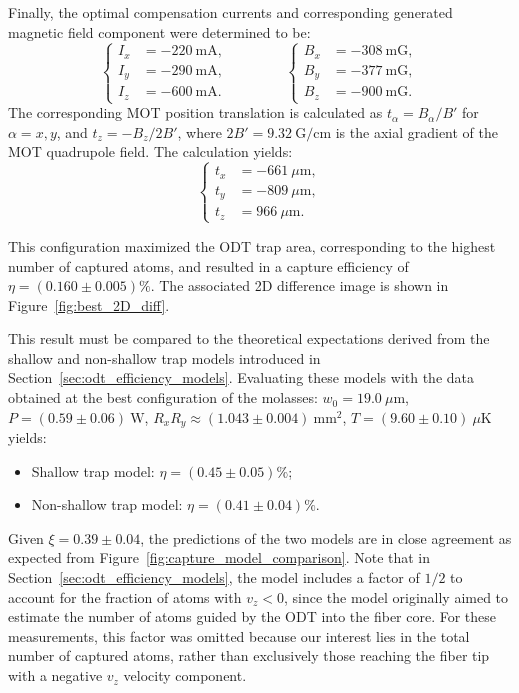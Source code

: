 Finally, the optimal compensation currents and corresponding generated magnetic field component were determined to be:
\begin{equation}
    \begin{cases}
        I_{x} &= -220~\mathrm{mA}, \\
        I_{y} &= -290~\mathrm{mA}, \\
        I_{z} &= -600~\mathrm{mA}.
    \end{cases}
    \qquad \qquad
        \begin{cases}
        B_{x} &= -308~\mathrm{mG}, \\
        B_{y} &= -377~\mathrm{mG}, \\
        B_{z} &= -900~\mathrm{mG}.
    \end{cases}
\end{equation}
The corresponding MOT position translation is calculated as $t_\alpha=B_\alpha/B'$ for $\alpha=x,y$, and $t_z=-B_z/2B'$, where $2B'=9.32~\text{G/cm}$ is the axial gradient of the MOT quadrupole field. The calculation yields:
\begin{equation}
    \begin{cases}
        t_{x} &= - 661~\mu\mathrm{m}, \\
        t_{y} &= -809~\mu\mathrm{m}, \\
        t_{z} &= 966~\mu\mathrm{m}.
    \end{cases}
\end{equation}

This configuration maximized the ODT trap area, corresponding to the highest number of captured atoms, and resulted in a capture efficiency of $\eta=(0.160\pm0.005)\%$. The associated 2D difference image is shown in Figure~\ref{fig:best_2D_diff}.

This result must be compared to the theoretical expectations derived from the shallow and non-shallow trap models introduced in Section~\ref{sec:odt_efficiency_models}. Evaluating these models with the data obtained at the best configuration of the molasses: $w_0=19.0~\mu\text{m}$, $P=(0.59\pm0.06)~\text{W}$, $R_xR_y\approx(1.043\pm0.004)~\text{mm}^2$, $T=(9.60 \pm 0.10)~\mu\text{K}$ yields:
\begin{itemize}
    \item Shallow trap model: $\eta = (0.45 \pm 0.05)\%$;
    \item Non-shallow trap model: $\eta = (0.41 \pm 0.04)\%$.
\end{itemize}
Given $\xi=0.39\pm0.04$, the predictions of the two models are in close agreement as expected from Figure~\ref{fig:capture_model_comparison}. Note that in Section~\ref{sec:odt_efficiency_models}, the model includes a factor of $1/2$ to account for the fraction of atoms with $v_z<0$, since the model originally aimed to estimate the number of atoms guided by the ODT into the fiber core. For these measurements, this factor was omitted because our interest lies in the total number of captured atoms, rather than exclusively those reaching the fiber tip with a negative $v_z$ velocity component.


